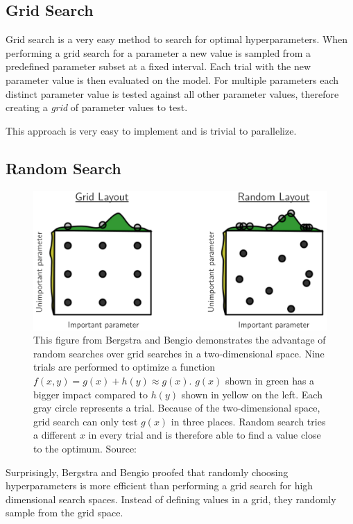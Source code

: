 \subsection{Grid Search}

Grid search is a very easy method to search for optimal hyperparameters. When performing a grid search for a parameter a new value is sampled from a predefined parameter subset at a fixed interval. Each trial with the new parameter value is then evaluated on the model. For multiple parameters each distinct parameter value is tested against all other parameter values, therefore creating a \textit{grid} of parameter values to test.

This approach is very easy to implement and is trivial to parallelize.

\subsection{Random Search}

\begin{figure}[ht]
	\centering
	\includegraphics[scale=0.35]{figures/03_theory/03_randomSearch}
	\caption{This figure from Bergstra and Bengio demonstrates the advantage of random searches over grid searches in a two-dimensional space. Nine trials are performed to optimize a function $f(x, y) = g(x) + h(y) \approx g(x)$. $g(x)$ shown in green has a bigger impact compared to $h(y)$ shown in yellow on the left. Each gray circle represents a trial. Because of the two-dimensional space, grid search can only test $g(x)$ in three places. Random search tries a different $x$ in every trial and is therefore able to find a value close to the optimum. Source: \cite{Bergstra2012a}}
	\label{fig:03_randomSearch}
\end{figure}

Surprisingly, Bergstra and Bengio proofed that randomly choosing hyperparameters is more efficient than performing a grid search \cite{Bergstra2012a} for high dimensional search spaces. Instead of defining values in a grid, they randomly sample from the grid space.

